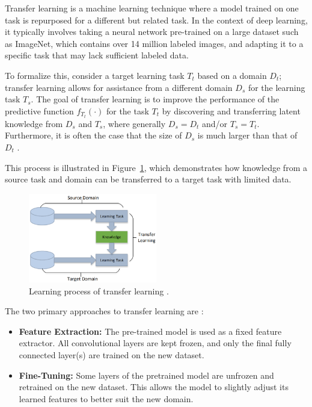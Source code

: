 Transfer learning is a machine learning technique where a model trained on one task is repurposed for a different but related task. In the context of deep learning, it typically involves taking a neural network pre-trained on a large dataset such as ImageNet, which contains over 14 million labeled images, and adapting it to a specific task that may lack sufficient labeled data.

To formalize this, consider a target learning task \( T_t \) based on a domain \( D_t \); transfer learning allows for assistance from a different domain \( D_s \) for the learning task \( T_s \). The goal of transfer learning is to improve the performance of the predictive function \( f_{T_t}(\cdot) \) for the task \( T_t \) by discovering and transferring latent knowledge from \( D_s \) and \( T_s \), where generally \( D_s = D_t \) and/or \( T_s = T_t \). Furthermore, it is often the case that the size of \( D_s \) is much larger than that of \( D_t \) \parencite{tan2018survey}.

This process is illustrated in Figure~\ref{fig:figure14}, which demonstrates how knowledge from a source task and domain can be transferred to a target task with limited data.

\begin{figure}[H] %
    \centering
    \includegraphics[width=0.5\textwidth]{chapters/chapter1/images/Figure14.png}
    \caption{Learning process of transfer learning \parencite{tan2018survey}.}
    \label{fig:figure14}
\end{figure}
The two primary approaches to transfer learning are \parencite{tan2018survey}:

\begin{itemize}
    \item \textbf{Feature Extraction:} The pre-trained model is used as a fixed feature extractor. All convolutional layers are kept frozen, and only the final fully connected layer(s) are trained on the new dataset.
    \item \textbf{Fine-Tuning:} Some layers of the pretrained model are unfrozen and retrained on the new dataset. This allows the model to slightly adjust its learned features to better suit the new domain.
\end{itemize}

